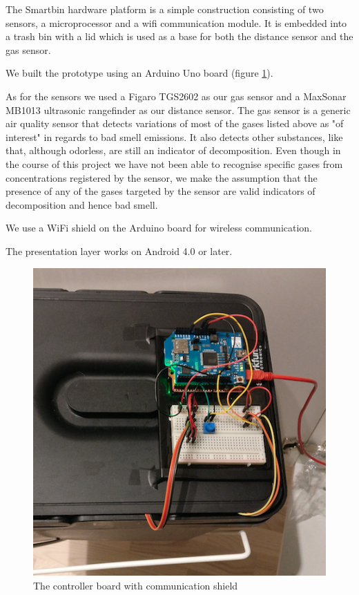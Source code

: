 The Smartbin hardware platform is a simple construction consisting of two sensors, a microprocessor and a wifi communication module. It is embedded into a trash bin with a lid which is used
as a base for both the distance sensor and the gas sensor.

We built the prototype using an Arduino Uno board (figure \ref{fig:board}).

 As for the sensors we used a Figaro TGS2602 as our gas sensor and a MaxSonar MB1013 ultrasonic rangefinder as our distance sensor.
The gas sensor is a generic air quality sensor that detects variations of most of the gases listed above as "of interest" in regards to bad smell emissions.
It also detects other substances, like   that, although odorless, are still an indicator of decomposition.
Even though in the course of this project we have not been able to recognise specific gases from  concentrations registered by the sensor, we make the assumption that the presence of any of the gases targeted by the sensor are valid indicators of decomposition and hence bad smell.

We use a WiFi shield on the Arduino board for wireless communication.

The presentation layer works on Android 4.0 or later.

\begin{figure}
\centering
\includegraphics[scale=.3]{img/arduinoboard}
\caption{The controller board with communication shield}
\label{fig:board}
\end{figure}
